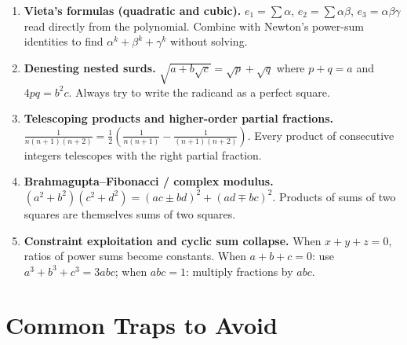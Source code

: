 \documentclass[11pt,a4paper]{article}
\begin{document}
\begin{enumerate}[leftmargin=2em, itemsep=4pt]
  \item \textbf{Vieta's formulas (quadratic and cubic).}
        $e_1=\sum\alpha$, $e_2=\sum\alpha\beta$, $e_3=\alpha\beta\gamma$ read directly
        from the polynomial. Combine with Newton's power-sum identities to find
        $\alpha^k+\beta^k+\gamma^k$ without solving. 

  \item \textbf{Denesting nested surds.}
        $\sqrt{a+b\sqrt{c}}=\sqrt{p}+\sqrt{q}$ where $p+q=a$ and $4pq=b^2c$.
        Always try to write the radicand as a perfect square. 

  \item \textbf{Telescoping products and higher-order partial fractions.}
        $\tfrac{1}{n(n+1)(n+2)}=\tfrac{1}{2}\!\left(\tfrac{1}{n(n+1)}-\tfrac{1}{(n+1)(n+2)}\right)$.
        Every product of consecutive integers telescopes with the right partial fraction. 

  \item \textbf{Brahmagupta--Fibonacci / complex modulus.}
        $(a^2+b^2)(c^2+d^2)=(ac\pm bd)^2+(ad\mp bc)^2$.
        Products of sums of two squares are themselves sums of two squares. 

  \item \textbf{Constraint exploitation and cyclic sum collapse.}
        When $x+y+z=0$, ratios of power sums become constants.
        When $a+b+c=0$: use $a^3+b^3+c^3=3abc$; when $abc=1$: multiply fractions by $abc$. 
\end{enumerate}

\section*{Common Traps to Avoid}
\end{document}
